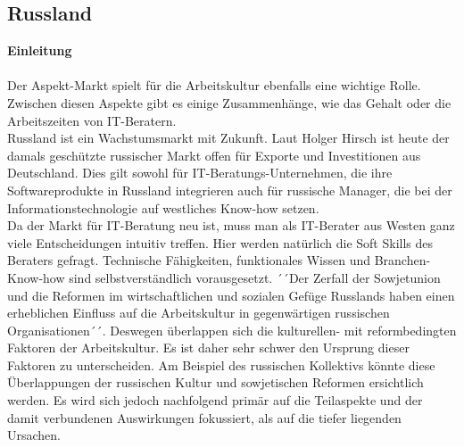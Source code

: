 	\subsection*{Russland}	
	\textbf{Einleitung}\\ \\
	Der Aspekt-Markt spielt für die Arbeitskultur ebenfalls eine wichtige Rolle. Zwischen diesen Aspekte gibt es einige Zusammenhänge, wie das Gehalt oder die Arbeitszeiten von IT-Beratern.\\
	Russland ist ein Wachstumsmarkt mit Zukunft. Laut Holger Hirsch ist heute der damals geschützte russischer Markt offen für Exporte und Investitionen aus Deutschland. Dies gilt sowohl für IT-Beratungs-Unternehmen, die ihre Softwareprodukte in Russland integrieren auch für russische Manager, die bei der Informationstechnologie auf westliches Know-how setzen.\cite{ITConsRu}\\
	Da der Markt für IT-Beratung neu ist, muss man als IT-Berater aus Westen ganz viele Entscheidungen intuitiv treffen. Hier werden natürlich die Soft Skills des Beraters gefragt. Technische Fähigkeiten, funktionales Wissen und Branchen-Know-how sind selbstverständlich vorausgesetzt. ´´Der Zerfall der Sowjetunion und die Reformen im wirtschaftlichen und sozialen Gefüge Russlands haben einen erheblichen Einfluss auf die Arbeitskultur in gegenwärtigen russischen Organisationen´´\cite{ProzessbeglBerRU}.
	Deswegen überlappen sich die kulturellen- mit reformbedingten Faktoren der Arbeitskultur. Es ist daher sehr schwer den Ursprung dieser Faktoren zu unterscheiden. Am Beispiel des russischen Kollektivs könnte diese Überlappungen der russischen Kultur und sowjetischen Reformen ersichtlich werden. Es wird sich jedoch nachfolgend primär auf die Teilaspekte und der damit verbundenen Auswirkungen fokussiert, als auf die tiefer liegenden Ursachen.

